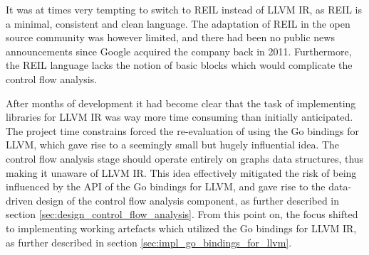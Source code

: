 It was at times very tempting to switch to REIL instead of LLVM IR, as REIL is a minimal, consistent and clean language. The adaptation of REIL in the open source community was however limited, and there had been no public news announcements since Google acquired the company back in 2011. Furthermore, the REIL language lacks the notion of basic blocks which would complicate the control flow analysis.

After months of development it had become clear that the task of implementing libraries for LLVM IR was way more time consuming than initially anticipated. The project time constrains forced the re-evaluation of using the Go bindings for LLVM, which gave rise to a seemingly small but hugely influential idea. The control flow analysis stage should operate entirely on graphs data structures, thus making it unaware of LLVM IR. This idea effectively mitigated the risk of being influenced by the API of the Go bindings for LLVM, and gave rise to the data-driven design of the control flow analysis component, as further described in section \ref{sec:design_control_flow_analysis}. From this point on, the focus shifted to implementing working artefacts which utilized the Go bindings for LLVM IR, as further described in section \ref{sec:impl_go_bindings_for_llvm}.

